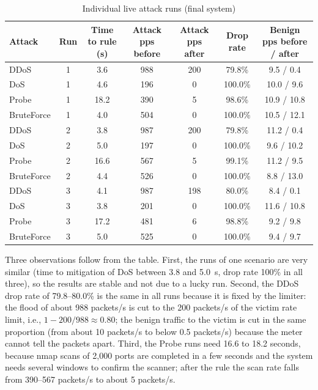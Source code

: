 \begin{table}[htbp]
\centering
\caption{Individual live attack runs (final system)}
\label{tab:perrun}
\small
\begin{tabular}{|l|c|c|c|c|c|c|}
\hline
\textbf{Attack} & \textbf{Run} & \textbf{Time to rule (s)} & \textbf{Attack pps before} & \textbf{Attack pps after} & \textbf{Drop rate} & \textbf{Benign pps before / after} \\ \hline
DDoS & 1 & 3.6 & 988 & 200 & 79.8\% & 9.5 / 0.4 \\ \hline
DoS & 1 & 4.6 & 196 & 0 & 100.0\% & 10.0 / 9.6 \\ \hline
Probe & 1 & 18.2 & 390 & 5 & 98.6\% & 10.9 / 10.8 \\ \hline
BruteForce & 1 & 4.0 & 504 & 0 & 100.0\% & 10.5 / 12.1 \\ \hline
DDoS & 2 & 3.8 & 987 & 200 & 79.8\% & 11.2 / 0.4 \\ \hline
DoS & 2 & 5.0 & 197 & 0 & 100.0\% & 9.6 / 10.2 \\ \hline
Probe & 2 & 16.6 & 567 & 5 & 99.1\% & 11.2 / 9.5 \\ \hline
BruteForce & 2 & 4.4 & 526 & 0 & 100.0\% & 8.8 / 13.0 \\ \hline
DDoS & 3 & 4.1 & 987 & 198 & 80.0\% & 8.4 / 0.1 \\ \hline
DoS & 3 & 3.8 & 201 & 0 & 100.0\% & 11.6 / 10.8 \\ \hline
Probe & 3 & 17.2 & 481 & 6 & 98.8\% & 9.2 / 9.8 \\ \hline
BruteForce & 3 & 5.0 & 525 & 0 & 100.0\% & 9.4 / 9.7 \\ \hline
\end{tabular}
\end{table}

Three observations follow from the table. First, the runs of one scenario are very similar (time to mitigation of DoS between 3.8 and 5.0~s, drop rate 100\% in all three), so the results are stable and not due to a lucky run. Second, the DDoS drop rate of 79.8--80.0\% is the same in all runs because it is fixed by the limiter: the flood of about 988 packets/s is cut to the 200 packets/s of the victim rate limit, i.e., $1-200/988\approx0.80$; the benign traffic to the victim is cut in the same proportion (from about 10 packets/s to below 0.5 packets/s) because the meter cannot tell the packets apart. Third, the Probe runs need 16.6 to 18.2 seconds, because nmap scans of 2,000 ports are completed in a few seconds and the system needs several windows to confirm the scanner; after the rule the scan rate falls from 390--567 packets/s to about 5 packets/s.


